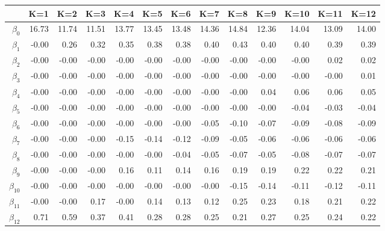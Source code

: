 \begin{table}[ht]
\centering
\begin{tabular}{rrrrrrrrrrrrr}
  \hline
 & K=1 & K=2 & K=3 & K=4 & K=5 & K=6 & K=7 & K=8 & K=9 & K=10 & K=11 & K=12 \\ 
  \hline
$\beta_{0}$ & 16.73 & 11.74 & 11.51 & 13.77 & 13.45 & 13.48 & 14.36 & 14.84 & 12.36 & 14.04 & 13.09 & 14.00 \\ 
  $\beta_{1}$ & -0.00 & 0.26 & 0.32 & 0.35 & 0.38 & 0.38 & 0.40 & 0.43 & 0.40 & 0.40 & 0.39 & 0.39 \\ 
  $\beta_{2}$ & -0.00 & -0.00 & -0.00 & -0.00 & -0.00 & -0.00 & -0.00 & -0.00 & -0.00 & -0.00 & 0.02 & 0.02 \\ 
  $\beta_{3}$ & -0.00 & -0.00 & -0.00 & -0.00 & -0.00 & -0.00 & -0.00 & -0.00 & -0.00 & -0.00 & -0.00 & 0.01 \\ 
  $\beta_{4}$ & -0.00 & -0.00 & -0.00 & -0.00 & -0.00 & -0.00 & -0.00 & -0.00 & 0.04 & 0.06 & 0.06 & 0.05 \\ 
  $\beta_{5}$ & -0.00 & -0.00 & -0.00 & -0.00 & -0.00 & -0.00 & -0.00 & -0.00 & -0.00 & -0.04 & -0.03 & -0.04 \\ 
  $\beta_{6}$ & -0.00 & -0.00 & -0.00 & -0.00 & -0.00 & -0.00 & -0.05 & -0.10 & -0.07 & -0.09 & -0.08 & -0.09 \\ 
  $\beta_{7}$ & -0.00 & -0.00 & -0.00 & -0.15 & -0.14 & -0.12 & -0.09 & -0.05 & -0.06 & -0.06 & -0.06 & -0.06 \\ 
  $\beta_{8}$ & -0.00 & -0.00 & -0.00 & -0.00 & -0.00 & -0.04 & -0.05 & -0.07 & -0.05 & -0.08 & -0.07 & -0.07 \\ 
  $\beta_{9}$ & -0.00 & -0.00 & -0.00 & 0.16 & 0.11 & 0.14 & 0.16 & 0.19 & 0.19 & 0.22 & 0.22 & 0.21 \\ 
  $\beta_{10}$ & -0.00 & -0.00 & -0.00 & -0.00 & -0.00 & -0.00 & -0.00 & -0.15 & -0.14 & -0.11 & -0.12 & -0.11 \\ 
  $\beta_{11}$ & -0.00 & -0.00 & 0.17 & -0.00 & 0.14 & 0.13 & 0.12 & 0.25 & 0.23 & 0.18 & 0.21 & 0.22 \\ 
  $\beta_{12}$ & 0.71 & 0.59 & 0.37 & 0.41 & 0.28 & 0.28 & 0.25 & 0.21 & 0.27 & 0.25 & 0.24 & 0.22 \\ 
   \hline
\end{tabular}
\end{table}
